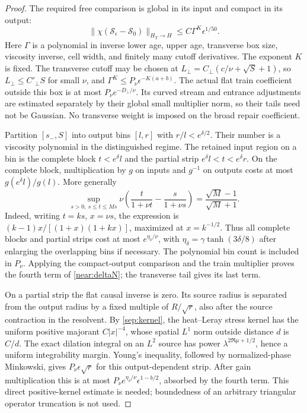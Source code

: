 \begin{proof}
The required free comparison is global in its input and compact in
its output:
\[
 \|\chi(\mathcal S_\epsilon-\mathcal S_0)\|_{H_T\to H}
       \le C\Gamma^K\epsilon^{1/50}.
\]
Here \(\Gamma\) is a polynomial in inverse lower age, upper age,
transverse box size, viscosity inverse, cell width, and finitely many
cutoff derivatives. The exponent \(K\) is fixed. The transverse
cutoff may be chosen at \(L_\perp=C_\perp(c/\nu+\sqrt S+1)\),
so \(L_\perp\le C'_\perp S\) for small \(\nu\), and
\(\Gamma^K\le P_\nu\epsilon^{-K(a+b)}\).
The actual flat train coefficient outside this box is at most
\(P_\nu e^{-D_\perp/\nu}\). Its curved stream and entrance
adjustments are estimated separately by their global small multiplier
norm, so their tails need not be Gaussian. No transverse weight is
imposed on the broad repair coefficient.

Partition \([s_-,S]\) into output bins \([l,r]\) with
\(r/l<e^{\delta/2}\). Their number is a viscosity polynomial
in the distinguished regime. The retained input region on a bin
is the complete block \(t<e^\delta l\) and the partial strip
\(e^\delta l<t<e^\delta r\). On the complete block, multiplication
by \(g\) on inputs and \(g^{-1}\) on outputs costs at most
\(g(e^\delta l)/g(l)\). More generally
\[
 \sup_{s>0,\ s\le t\le Ms}
 \nu\left(\frac{t}{1+\nu t}-\frac{s}{1+\nu s}\right)
     =\frac{\sqrt M-1}{\sqrt M+1}.
\]
Indeed, writing \(t=ks\), \(x=\nu s\), the expression is
\((k-1)x/[(1+x)(1+kx)]\), maximized at \(x=k^{-1/2}\).
Thus all complete blocks and partial strips cost at most
\(e^{\eta_\delta/\nu}\), with
\(\eta_\delta=\gamma\tanh(3\delta/8)\) after enlarging the
overlapping bins if necessary. The polynomial bin count is included
in \(P_\nu\). Applying the compact-output comparison and the train
multiplier proves the fourth term of \eqref{near:deltaN}; the
transverse tail gives its last term.

On a partial strip the flat causal inverse is zero. Its source radius
is separated from the output radius by a fixed multiple of
\(R/\sqrt r\), also after the source contraction in the resolvent.
By \eqref{sep:kernel}, the heat--Leray stress kernel has the
uniform positive majorant $C|x|^{-4}$, whose spatial $L^1$ norm
outside distance $d$ is $C/d$.
The exact dilation integral on an \(L^2\) source has power
\(\lambda^{2\Re\mu+1/2}\), hence a uniform integrability margin.
Young's inequality, followed by normalized-phase Minkowski, gives
\(P_\nu\epsilon\sqrt r\) for this output-dependent strip.
After gain multiplication this is at most
\(P_\nu e^{\eta_\delta/\nu}\epsilon^{1-b/2}\), absorbed by
the fourth term. This direct positive-kernel estimate is needed;
boundedness of an arbitrary triangular operator truncation is not used.


\end{proof}
